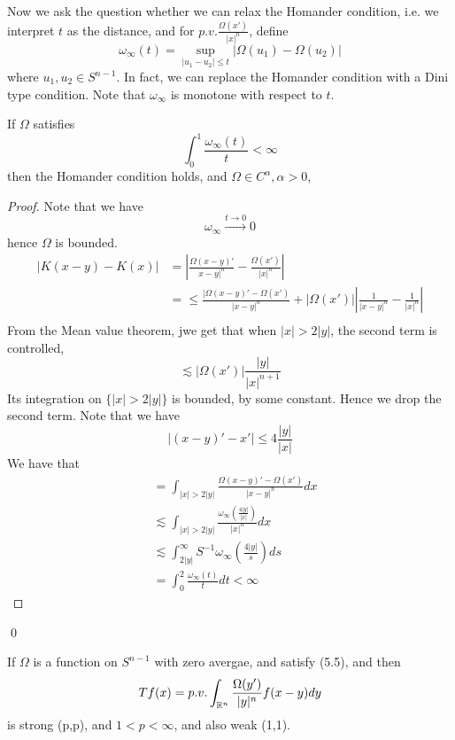 Now we ask the question whether we can relax the Homander condition, i.e. we interpret $t$ as the distance, and for $p.v. \frac{\Omega(x')}{|x|^n}$, define
\begin{equation*}
    \omega_\infty(t)=\sup_{|u_1-u_2|\leq t}|\Omega(u_1)-\Omega(u_2)|
\end{equation*}
where $u_1, u_2\in S^{n-1}$. In fact, we can replace the Homander condition with a Dini type condition. Note that $\omega_\infty$ is monotone with respect to $t$.

\begin{proposition}
    If $\Omega$ satisfies 
    \begin{equation*}
        \int_0^1\frac{\omega_\infty(t)}{t}<\infty
    \end{equation*}
    then the Homander condition holds, and $\Omega\in C^\alpha, \alpha>0$, 
\end{proposition}
\begin{proof}
    Note that we have
    \begin{equation*}
        \omega_\infty\xrightarrow{t\to 0}0
    \end{equation*}
    hence $\Omega$ is bounded.
    \begin{align*}
        |K(x-y)-K(x)|&=\left|\frac{\Omega(x-y)'}{x-y|^n}-\frac{\Omega(x')}{|x|^n}\right|\\
        &=\leq \frac{|\Omega(x-y)'-\Omega(x')}{|x-y|^n}+|\Omega(x')|\left|\frac{1}{|x-y|^n}-\frac{1}{|x|^n}\right|\\
    \end{align*}
    From the Mean value theorem, jwe get that when $|x|>2|y|$, the second term is controlled,
    \begin{equation*}
        \lesssim |\Omega(x')|\frac{|y|}{|x|^{n+1}}
    \end{equation*}
    Its integration on $\{|x|>2|y|\}$ is bounded, by some constant. Hence we drop the second term. Note that we have
    \begin{equation*}
        |(x-y)'-x'|\leq 4\frac{|y|}{|x|}
    \end{equation*}
    We have that
    \begin{align*}
        &=\int_{|x|>2|y|}\frac{\Omega(x-y)'-\Omega(x')}{|x-y|^n}dx\\
        &\lesssim \int_{|x|>2|y|}\frac{\omega_\infty\left(\frac{4|y|}{|x|}\right)}{|x|^n}dx\\
        &\lesssim \int_{2|y|}^\infty S^{-1}\omega_\infty\left(\frac{4|y|}{s}\right)ds\\
        &=\int_0^2\frac{\omega_\infty(t)}{t}dt<\infty
    \end{align*}
\end{proof}
\qed

\begin{corollary}
    If $\Omega$ is a function on $S^{n-1}$ with zero avergae, and satisfy (5.5), and then
    \begin{equation*}
        Tf(x)=p.v.\int_{\mathbb{R}^n}\frac{\Omega(y')}{|y|^n}f(x-y)dy
    \end{equation*}
    is strong (p,p), and $1<p<\infty$, and also weak (1,1).
\end{corollary}

